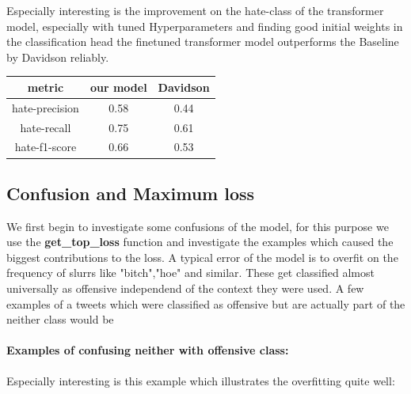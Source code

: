 \documentclass[11pt,a4paper]{article}
\begin{document}
Especially interesting is the improvement on the hate-class of the transformer model, especially with tuned Hyperparameters and
finding good initial weights in the classification head the finetuned transformer model outperforms the Baseline by Davidson reliably.

\begin{table}[h]
  \begin{tabular}{c | c  c}
    metric & our model & Davidson \\
    \hline
    hate-precision &  0.58 & 0.44 \\
    hate-recall &  0.75 & 0.61 \\  
    hate-f1-score &  0.66 & 0.53 \\
  \end{tabular}
\end{table}

\subsection{Confusion and Maximum loss}
We first begin to investigate some confusions of the model, for this purpose we use the \textbf{get\_top\_loss} function and investigate the examples which
caused the biggest contributions to the loss.
A typical error of the model is to overfit on the frequency of slurrs like "bitch","hoe" and similar.
These get classified almost universally as offensive independend of the context they were used.
A few examples of a tweets which were classified as offensive but are actually part of the neither class would be

\paragraph{Examples of confusing neither with offensive class:}
\begin{center}
   \newline
   \newline
   \newline
  \newline
\end{center}

Especially interesting is this example which illustrates the overfitting quite well:

\begin{center}
\end{center}
\end{document}
